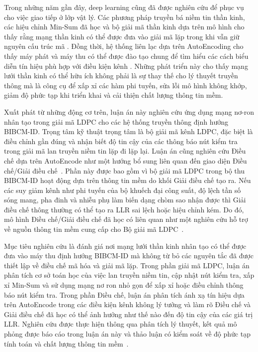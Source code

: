 Trong những năm gần đây, deep learning cũng đã được nghiên cứu để phục vụ cho việc giao tiếp ở lớp vật lý. Các phương pháp truyền bá niềm tin thần kinh, các hiệu chỉnh Min-Sum đã học và bộ giải mã thần kinh dựa trên mô hình cho thấy rằng mạng thần kinh có thể được đưa vào giải mã lặp trong khi vẫn giữ nguyên cấu trúc mã \cite{nachmani2016,nachmani2018,kuck2020,wang2022}. Đồng thời, hệ thống liên lạc dựa trên AutoEncoding cho thấy máy phát và máy thu có thể được đào tạo chung để tìm hiểu các cách biểu diễn tín hiệu phù hợp với điều kiện kênh \cite{oshea2017,dorner2018,aoudia2019}. Những phát triển này cho thấy mạng lưới thần kinh có thể hữu ích không phải là sự thay thế cho lý thuyết truyền thông mà là công cụ để xấp xỉ các hàm phi tuyến, sửa lỗi mô hình không khớp, giảm độ phức tạp khi triển khai và cải thiện chất lượng thông tin mềm.

Xuất phát từ những động cơ trên, luận án này nghiên cứu ứng dụng mạng nơ-ron nhân tạo trong giải mã LDPC cho các hệ thống truyền thông định hướng BIBCM-ID. Trọng tâm kỹ thuật trọng tâm là bộ giải mã kênh LDPC, đặc biệt là điều chỉnh gần đúng và nhận biết độ tin cậy của các thông báo nút kiểm tra trong giải mã lan truyền niềm tin lặp đi lặp lại. Luận án cũng nghiên cứu Điều chế dựa trên AutoEncode như một hướng bổ sung liên quan đến giao diện Điều chế/Giải điều chế~. Phần này được bao gồm vì bộ giải mã LDPC trong bộ thu BIBCM-ID hoạt động dựa trên thông tin mềm do khối Giải điều chế tạo ra. Nếu các suy giảm kênh như phi tuyến của bộ khuếch đại công suất, độ lệch tần số sóng mang, pha đinh và nhiễu phụ làm biến dạng chòm sao nhận được thì Giải điều chế thông thường có thể tạo ra LLR sai lệch hoặc hiệu chỉnh kém. Do đó, mô hình Điều chế/Giải điều chế đã học có liên quan như một nghiên cứu hỗ trợ về nguồn thông tin mềm cung cấp cho Bộ giải mã LDPC~.

Mục tiêu nghiên cứu là đánh giá nơi mạng lưới thần kinh nhân tạo có thể được đưa vào máy thu định hướng BIBCM-ID mà không từ bỏ các nguyên tắc đã được thiết lập về điều chế mã hóa và giải mã lặp. Trong phần giải mã LDPC, luận án phân tích cơ sở toán học của việc lan truyền niềm tin, cập nhật nút kiểm tra, xấp xỉ Min-Sum và sử dụng mạng nơ ron nhỏ gọn để xấp xỉ hoặc điều chỉnh thông báo nút kiểm tra. Trong phần Điều chế, luận án phân tích ánh xạ tín hiệu dựa trên AutoEncode trong các điều kiện kênh không lý tưởng và làm rõ Điều chế và Giải điều chế đã học có thể ảnh hưởng như thế nào đến độ tin cậy của các giá trị LLR. Nghiên cứu được thực hiện thông qua phân tích lý thuyết, kết quả mô phỏng được báo cáo trong luận án này và thảo luận có kiểm soát về độ phức tạp tính toán và chất lượng thông tin mềm~.

